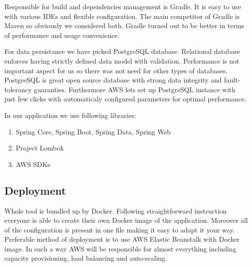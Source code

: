 \documentclass[licencjacka,en]{thesisclass}
\begin{document}
    Responsible for build and dependencies management is Gradle. It is easy to use with various IDEs and flexible configuration. The main competitor of Gradle is Maven so obviously we considered both. Gradle turned out to be better in terms of performance and usage convenience.

    For data persistance we have picked PostgreSQL database. Relational database enforces having strictly defined data model with validation. Performance is not important aspect for us so there was not need for other types of databases. PostgreSQL is great open source database with strong data integrity and fault-tolerancy guaranties. Furthermore AWS lets set up PostgreSQL instance with just few clicks with automaticaly configured parameters for optimal performance.

    In our application we use following libraries:
    \begin{enumerate}
        \item Spring Core, Spring Boot, Spring Data, Spring Web
        \item Project Lombok
        \item AWS SDKs
    \end{enumerate}

    \subsection{Deployment}

    Whole tool is bundled up by Docker. Following straightforward instruction everyone is able to create their own Docker image of the application. Moreover all of the configuration is present in one file making it easy to adapt it your way. Preferable method of deployment is to use AWS Elastic Beanstalk with Docker image. In such a way AWS will be responsible for almost everything including capacity provisioning, load balancing and auto-scaling.
\end{document}
